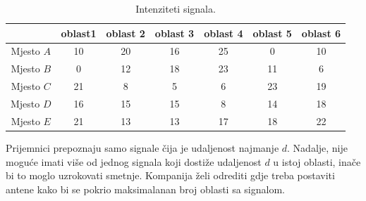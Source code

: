 \documentclass[a4paper, utf8, 11pt, colorlinks]{book}
\begin{document}
\begin{table}[!ht]
    \centering
    \begin{tabular}{c|cccccc} \hline
     \              & oblast1 & oblast 2 & oblast 3 & oblast 4 & oblast 5 & oblast 6 \\ \hline
     Mjesto $A$     & 10  & 20 & 16 & 25 & 0   & 10   \\
     Mjesto $B$     & 0   & 12 & 18 &  23 & 11 & 6   \\
     Mjesto $C$     & 21  &  8 & 5  &  6 & 23  &  19 \\
     Mjesto $D$    &  16 &  15 & 15 &  8 & 14 & 18   \\
     Mjesto $E $    &  21 & 13 & 13 & 17 & 18  & 22    \\ \hline
    \end{tabular}
    \caption{Intenziteti signala.}
    \label{tab:tb-3}
\end{table}

Prijemnici prepoznaju samo signale čija je udaljenost najmanje   $d$. Nadalje, nije moguće imati više od jednog signala koji dostiže udaljenost $d$ u istoj oblasti, inače bi to moglo uzrokovati smetnje. %
Kompanija želi odrediti gdje treba postaviti antene kako bi se pokrio maksimalanan broj oblasti sa signalom. 
\end{document}
